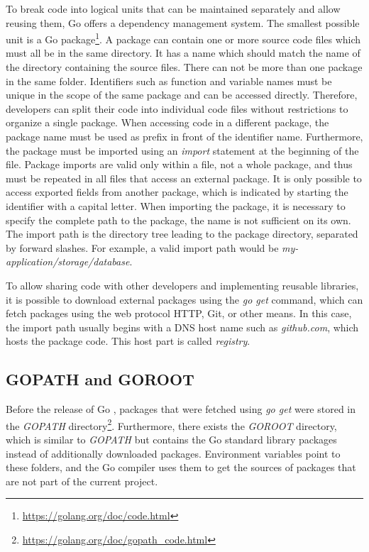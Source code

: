 To break code into logical units that can be maintained separately and allow reusing them, Go offers a dependency
management system.
The smallest possible unit is a Go package\footnote{\url{https://golang.org/doc/code.html}}.
A package can contain one or more source code files which must all be in the same directory.
It has a name which should match the name of the directory containing the source files.
There can not be more than one package in the same folder.
Identifiers such as function and variable names must be unique in the scope of the same package and can be accessed
directly.
Therefore, developers can split their code into individual code files without restrictions to organize a single package.
When accessing code in a different package, the package name must be used as prefix in front of the identifier name.
Furthermore, the package must be imported using an \textit{import} statement at the beginning of the file.
Package imports are valid only within a file, not a whole package, and thus must be repeated in all files that access
an external package.
It is only possible to access exported fields from another package, which is indicated by starting the identifier with
a capital letter.
When importing the package, it is necessary to specify the complete path to the package, the name is not sufficient on
its own.
The import path is the directory tree leading to the package directory, separated by forward slashes.
For example, a valid import path would be \textit{my-application/storage/database}.

To allow sharing code with other developers and implementing reusable libraries, it is possible to download external
packages using the \textit{go get} command, which can fetch packages using the web protocol \acrshort{HTTP}, Git, or
other means.
In this case, the import path usually begins with a \acrshort{DNS} host name such as \textit{github.com}, which hosts
the package code.
This host part is called \textit{registry}.



\subsection{GOPATH and GOROOT}\label{subsec:background:dependencies:gopath}

Before the release of Go , packages that were fetched using \textit{go get} were stored in the
\textit{GOPATH} directory\footnote{\url{https://golang.org/doc/gopath_code.html}}.
Furthermore, there exists the \textit{GOROOT} directory, which is similar to \textit{GOPATH} but contains the Go
standard library packages instead of additionally downloaded packages.
Environment variables point to these folders, and the Go compiler uses them to get the sources of packages that are not
part of the current project.

